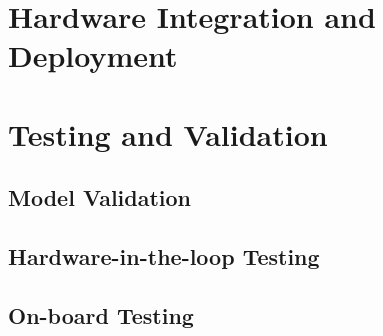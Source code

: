 \section{Hardware Integration and Deployment}

\section{Testing and Validation}
\subsection{Model Validation}
\subsection{Hardware-in-the-loop Testing}
\subsection{On-board Testing}